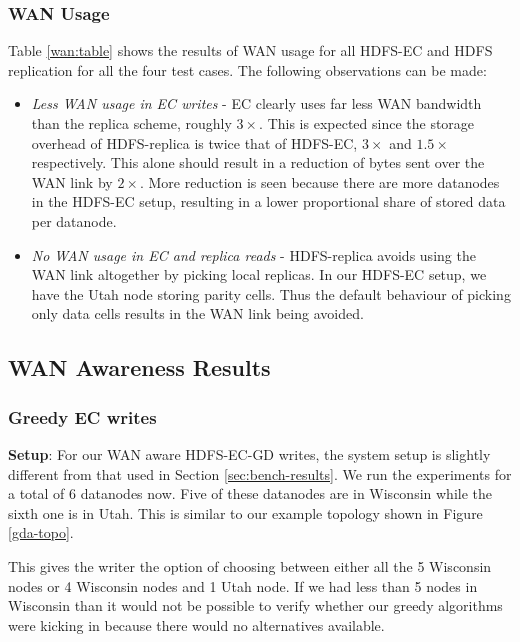 \documentclass{sig-alternate-05-2015}
\begin{document}
\subsubsection{WAN Usage}
Table \ref{wan:table} shows the results of WAN usage for all HDFS-EC and HDFS replication for all the four test cases. The following observations can be made:

\begin{itemize}
\item \emph{Less WAN usage in EC writes} - EC clearly uses far less WAN bandwidth than the replica scheme, roughly $3\times $. This is expected since the storage overhead of HDFS-replica is twice that of HDFS-EC, $3\times $ and $1.5\times $ respectively. This alone should result in a reduction of bytes sent over the WAN link by $2\times $. More reduction is seen because there are more datanodes in the HDFS-EC setup, resulting in a lower proportional share of stored data per datanode. 

\item \emph{No WAN usage in EC and replica reads} - HDFS-replica avoids using the WAN link altogether by picking local replicas. In our HDFS-EC setup, we have the Utah node storing parity cells. Thus the default behaviour of picking only data cells results in the WAN link being avoided. 
\end{itemize}

\subsection{WAN Awareness Results}

\subsubsection{Greedy EC writes}
\label{sec:greedy-ec-writes}
\textbf{Setup}: For our WAN aware HDFS-EC-GD writes, the system setup is slightly different from that used in Section \ref{sec:bench-results}. We run the experiments for a total of 6 datanodes now. Five of these datanodes are in Wisconsin while the sixth one is in Utah. This is similar to our example topology shown in Figure \ref{gda-topo}. 

This gives the writer the option of choosing between either all the 5 Wisconsin nodes or 4 Wisconsin nodes and 1 Utah node. If we had less than 5 nodes in Wisconsin than it would not be possible to verify whether our greedy algorithms were kicking in because there would no alternatives available. 
\end{document}
